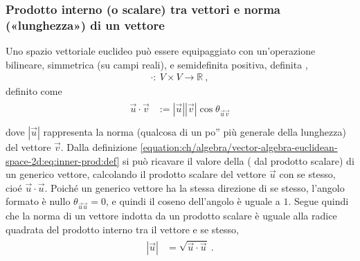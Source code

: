\documentclass[letterpaper,10pt,italian]{jupyterBook}
\begin{document}
\subsubsection{Prodotto interno (o scalare) tra vettori e norma («lunghezza») di un vettore}
\label{\detokenize{ch/algebra/vector-algebra-euclidean-space-2d:prodotto-interno-o-scalare-tra-vettori-e-norma-lunghezza-di-un-vettore}}\label{\detokenize{ch/algebra/vector-algebra-euclidean-space-2d:math-hs-algebra-vector-euclidean-space-2d-inner-product}}
\sphinxAtStartPar
Uno spazio vettoriale euclideo può essere equipaggiato con un’operazione bilineare, simmetrica (su campi reali), e semi\sphinxhyphen{}definita positiva, definita ,
\begin{equation*}
\begin{split}\cdot: \ V \times V \rightarrow \mathbb{R} \ ,\end{split}
\end{equation*}
\sphinxAtStartPar
definito come
\begin{equation}\label{equation:ch/algebra/vector-algebra-euclidean-space-2d:eq:inner-prod:def}
\begin{split}\begin{aligned}
  \vec{u} \cdot \vec{v} & := |\vec{u}||\vec{v}| \cos \theta_{\vec{u} \vec{v}}  \\
\end{aligned}\end{split}
\end{equation}
\sphinxAtStartPar
dove \(|\vec{u}|\) rappresenta la norma (qualcosa di un po” più generale della lunghezza) del vettore \(\vec{v}\). Dalla definizione \eqref{equation:ch/algebra/vector-algebra-euclidean-space-2d:eq:inner-prod:def} si può ricavare il valore della  ( dal prodotto scalare) di un generico vettore, calcolando il prodotto scalare del vettore \(\vec{u}\) con se stesso, cioé \(\vec{u} \cdot \vec{u}\). Poiché un generico vettore ha la stessa direzione di se stesso, l’angolo formato è nullo \(\theta_{\vec{u} \vec{u}} = 0\), e quindi il coseno dell’angolo è uguale a \(1\). Segue quindi che la norma di un vettore indotta da un prodotto scalare è uguale alla radice quadrata del prodotto interno tra il vettore e se stesso,
\begin{equation*}
\begin{split}\begin{aligned}
  |\vec{u}| & = \sqrt{\vec{u} \cdot \vec{u}} \ .
\end{aligned}\end{split}
\end{equation*}
\end{document}
